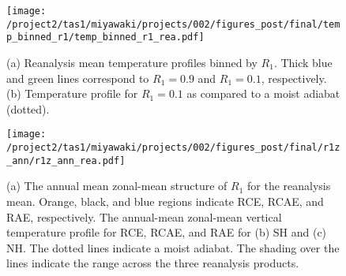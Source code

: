 \documentclass{ametsocV5}
\begin{document}
\begin{figure}
  \noindent\texttt{[image: /project2/tas1/miyawaki/projects/002/figures\_post/final/temp\_binned\_r1/temp\_binned\_r1\_rea.pdf]}\\
  \caption{(a) Reanalysis mean temperature profiles binned by $R_{1}$. Thick blue and green lines correspond to $R_1=0.9$ and $R_1=0.1$, respectively. (b) Temperature profile for $R_1=0.1$ as compared to a moist adiabat (dotted).}
  \label{fig:rea-binned-r1}
\end{figure}


\begin{figure}[t]
  \noindent\texttt{[image: /project2/tas1/miyawaki/projects/002/figures\_post/final/r1z\_ann/r1z\_ann\_rea.pdf]}\\
  \caption{(a) The annual mean zonal-mean structure of $R_{1}$ for the reanalysis mean. Orange, black, and blue regions indicate RCE, RCAE, and RAE, respectively. The annual-mean zonal-mean vertical temperature profile for RCE, RCAE, and RAE for (b) SH and (c) NH. The dotted lines indicate a moist adiabat. The shading over the lines indicate the range across the three reanalysis products.}
  \label{fig:rea-r1-ann}
\end{figure}

\end{document}
